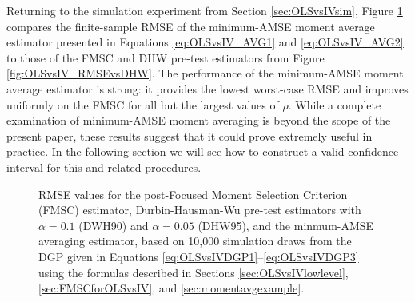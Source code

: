 Returning to the simulation experiment from Section \ref{sec:OLSvsIVsim}, Figure \ref{fig:OLSvsIV_AVG} compares the finite-sample RMSE of the minimum-AMSE moment average estimator presented in Equations \ref{eq:OLSvsIV_AVG1} and \ref{eq:OLSvsIV_AVG2} to those of the FMSC and DHW pre-test estimators from Figure \ref{fig:OLSvsIV_RMSEvsDHW}.
The performance of the minimum-AMSE moment average estimator is strong: it provides the lowest worst-case RMSE and improves uniformly on the FMSC for all but the largest values of $\rho$.
While a complete examination of minimum-AMSE moment averaging is beyond the scope of the present paper, these results suggest that it could prove extremely useful in practice.
In the following section we will see how to construct a valid confidence interval for this and related procedures.
\begin{figure}
\centering
	
	\caption{RMSE values for the post-Focused Moment Selection Criterion (FMSC) estimator, Durbin-Hausman-Wu pre-test estimators with $\alpha = 0.1$ (DWH90) and $\alpha = 0.05$ (DHW95), and the minmum-AMSE averaging estimator, based on 10,000 simulation draws from the DGP given in Equations \ref{eq:OLSvsIVDGP1}--\ref{eq:OLSvsIVDGP3} using the formulas described in Sections \ref{sec:OLSvsIVlowlevel}, \ref{sec:FMSCforOLSvsIV}, and \ref{sec:momentavgexample}.}
	\label{fig:OLSvsIV_AVG}
\end{figure}